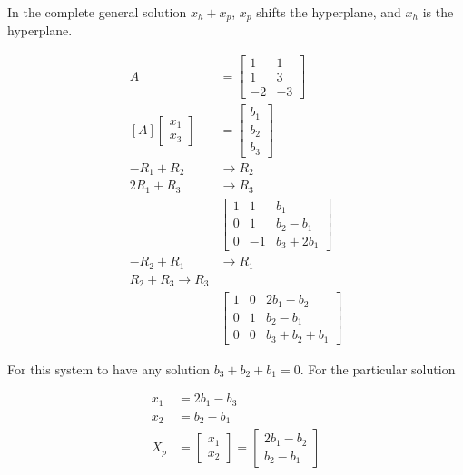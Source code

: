 \documentclass[main.tex]{subfiles}
\begin{document}
In the complete general solution $x_h + x_p$, $x_p$ shifts the hyperplane, and $x_h$ is the hyperplane.

$$
\begin{aligned}
A &= \left[\begin{array}{cc}
1 & 1 \\
1 & 3 \\
-2 & -3
\end{array}\right]\\
[A]\left[\begin{array}{l}
x_{1} \\
x_{3}
\end{array}\right]&=\left[\begin{array}{l}
b_{1} \\
b_{2} \\
b_{3}
\end{array}\right]\\
-R_1 + R_2 &\rightarrow R_2 \\
2R_1 + R_3 &\rightarrow R_3 \\
&\left[\begin{array}{cc|c}
1 & 1 & b_{1} \\
0 & 1 & b_{2}-b_{1} \\
0 & -1 & b_{3}+2 b_{1}
\end{array}\right]\\
-R_2 + R_1 &\rightarrow R_1\\
R_2+R_3 \rightarrow R_3\\
&\left[\begin{array}{ll|l}
1 & 0 & 2 b_{1}-b_{2} \\
0 & 1 & b_{2}-b_{1} \\
0 & 0 & b_{3}+b_{2}+b_{1}
\end{array}\right]
\end{aligned}
$$

For this system to have any solution $b_{3}+b_{2}+b_{1}=0$. For the particular solution 

$$
\begin{aligned}
x_{1} &= 2 b_{1}-b_{3} \\
x_{2} &= b_{2}-b_{1} \\
X_{p}&=\left[\begin{array}{c}
x_{1} \\
x_{2}
\end{array}\right]=\left[\begin{array}{c}
2 b_{1}-b_{2} \\
b_{2}-b_{1}
\end{array}\right]
\end{aligned}
$$
\end{document}
